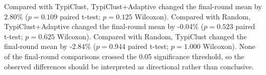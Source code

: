 Compared with TypiClust, TypiClust+Adaptive changed the final-round mean by 2.80\% ($p=0.109$ paired t-test; $p=0.125$ Wilcoxon). Compared with Random, TypiClust+Adaptive changed the final-round mean by -0.04\% ($p=0.523$ paired t-test; $p=0.625$ Wilcoxon). Compared with Random, TypiClust changed the final-round mean by -2.84\% ($p=0.944$ paired t-test; $p=1.000$ Wilcoxon). None of the final-round comparisons crossed the 0.05 significance threshold, so the observed differences should be interpreted as directional rather than conclusive.
